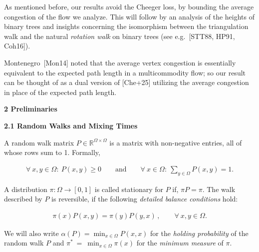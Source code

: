 


As mentioned before, our results avoid the Cheeger loss, by bounding the average congestion of the flow we analyze. This will follow by an analysis of the heights of binary trees and insights concerning the isomorphism between the triangulation walk and the natural \emph{rotation walk} on binary trees (see e.g. [STT88, HP91, Coh16]).\par




Montenegro [Mon14] noted that the average vertex congestion is essentially equivalent to the expected path length in a multicommodity flow; so our result can be thought of as a dual version of [Che+25] utilizing the average congestion in place of the expected path length.\par






\par\medskip\noindent\textbf{2 Preliminaries}\par




\par\medskip\noindent\textbf{2.1 Random Walks and Mixing Times}\par




A random walk matrix $P\in\mathbb{R}^{\Omega\times\Omega}$ is a matrix with non-negative entries, all of whose rows sum to 1. Formally,\par


\[\begin{gathered}
\forall~x,y\in\Omega:~P(x,y)\geq 0\qquad\textrm{and}\qquad\forall~x\in\Omega:~\sum_{y\in\Omega}P(x,y)=1.
\end{gathered}\]


A distribution $\pi:\Omega\to[0,1]$ is called stationary for $P$ if, $\pi P=\pi$. The walk described by $P$ is reversible, if the following \emph{detailed balance conditions} hold:\par


\[\begin{gathered}
\pi(x)P(x,y)=\pi(y)P(y,x)\,,\quad\quad\forall~x,y\in\Omega.
\end{gathered}\]


We will also write $\alpha(P)=\min_{x\in\Omega}P(x,x)$ for the \emph{holding probability} of the random walk $P$ and $\pi^{*}~=~\min_{x\in\Omega}\pi(x)$ for the \emph{minimum measure} of $\pi$.\par




